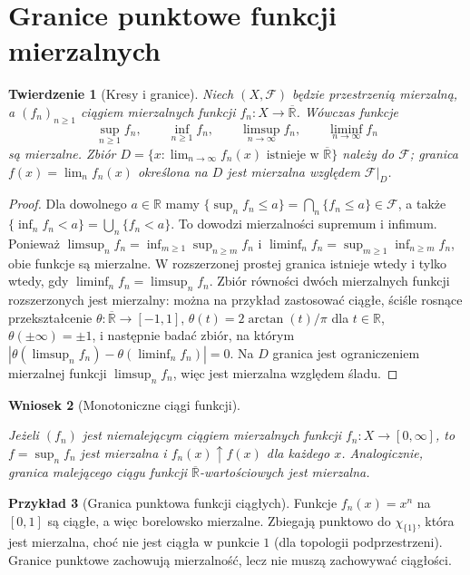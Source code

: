 \documentclass[11pt,a4paper,oneside]{book}
\numberwithin{equation}{chapter}
\theoremstyle{plain}
\newtheorem{twierdzenie}{Twierdzenie}[chapter]
\newtheorem{wniosek}[twierdzenie]{Wniosek}
\theoremstyle{definition}
\newtheorem{przyklad}[twierdzenie]{Przykład}
\theoremstyle{remark}
\begin{document}
\section{Granice punktowe funkcji mierzalnych}

\begin{twierdzenie}[Kresy i granice]
\label{thm:pointwise-limits}
Niech $(X,\mathcal F)$ będzie przestrzenią mierzalną,
a $(f_n)_{n\ge1}$ ciągiem mierzalnych funkcji
$f_n:X\to\overline{\mathbb R}$. Wówczas funkcje
\[
\sup_{n\ge1}f_n,\qquad \inf_{n\ge1}f_n,\qquad
\limsup_{n\to\infty}f_n,\qquad
\liminf_{n\to\infty}f_n
\]
są mierzalne. Zbiór
$D=\{x:\lim_{n\to\infty}f_n(x)\text{ istnieje w }
\overline{\mathbb R}\}$ należy do $\mathcal F$;
granica $f(x)=\lim_nf_n(x)$ określona na $D$ jest
mierzalna względem $\mathcal F|_D$.
\end{twierdzenie}
\begin{proof}
Dla dowolnego $a\in\mathbb R$ mamy
$\{\sup_nf_n\le a\}=\bigcap_n\{f_n\le a\}\in\mathcal F$,
a także $\{\inf_nf_n<a\}=\bigcup_n\{f_n<a\}$.
To dowodzi mierzalności supremum i infimum.
Ponieważ
$\limsup_nf_n=\inf_{m\ge1}\sup_{n\ge m}f_n$ i
$\liminf_nf_n=\sup_{m\ge1}\inf_{n\ge m}f_n$,
obie funkcje są mierzalne.
W rozszerzonej prostej granica istnieje wtedy
i tylko wtedy, gdy $\liminf_nf_n=\limsup_nf_n$.
Zbiór równości dwóch mierzalnych funkcji rozszerzonych
jest mierzalny: można na przykład zastosować
ciągłe, ściśle rosnące przekształcenie
$\theta:\overline{\mathbb R}\to[-1,1]$,
$\theta(t)=2\arctan(t)/\pi$ dla $t\in\mathbb R$,
$\theta(\pm\infty)=\pm1$, i następnie badać zbiór,
na którym $|\theta(\limsup_nf_n)-
\theta(\liminf_nf_n)|=0$.
Na $D$ granica jest ograniczeniem mierzalnej funkcji
$\limsup_nf_n$, więc jest mierzalna względem śladu.
\end{proof}

\begin{wniosek}[Monotoniczne ciągi funkcji]\label{idx:06:wniosek:06}

Jeżeli $(f_n)$ jest niemalejącym ciągiem mierzalnych
funkcji $f_n:X\to[0,\infty]$, to $f=\sup_nf_n$
jest mierzalna i $f_n(x)\uparrow f(x)$ dla każdego $x$.
Analogicznie, granica malejącego ciągu funkcji
$\overline{\mathbb R}$-wartościowych jest mierzalna.
\end{wniosek}

\begin{przyklad}[Granica punktowa funkcji ciągłych]
Funkcje $f_n(x)=x^n$ na $[0,1]$ są ciągłe,
a więc borelowsko mierzalne. Zbiegają punktowo do
$\chi_{\{1\}}$, która jest mierzalna, choć
nie jest ciągła w punkcie $1$ (dla topologii podprzestrzeni).
Granice punktowe zachowują mierzalność, lecz nie muszą
zachowywać ciągłości.
\end{przyklad}
\end{document}
